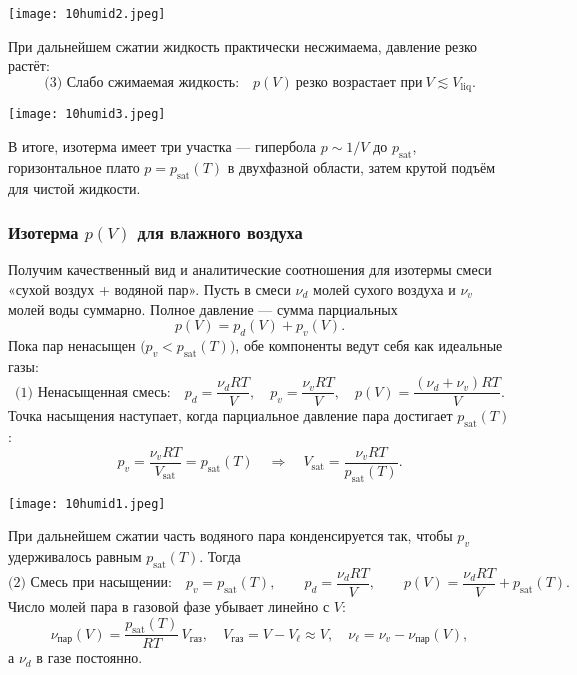 \documentclass[12pt, a4paper]{article}%
\begin{document}
\begin{center}
\texttt{[image: 10humid2.jpeg]}
\label{fig:mpr}
\end{center}

При дальнейшем сжатии жидкость практически несжимаема, давление резко растёт:
\[
\text{(3) Слабо сжимаемая жидкость:}\quad p(V)\ \text{резко возрастает при}\ V\lesssim V_{\text{liq}}.
\]

\begin{center}
\texttt{[image: 10humid3.jpeg]}
\label{fig:mpr}
\end{center}

В итоге, изотерма имеет три участка — гипербола \(p\sim 1/V\) до \(p_{\text{sat}}\), горизонтальное плато \(p=p_{\text{sat}}(T)\) в двухфазной области, затем крутой подъём для чистой жидкости.


\subsubsection*{ Изотерма \(p(V)\) для влажного воздуха}
Получим качественный вид и аналитические соотношения для изотермы смеси «сухой воздух + водяной пар».
Пусть в смеси \(\nu_d\) молей сухого воздуха и \(\nu_v\) молей воды суммарно. Полное давление — сумма парциальных
\[
p(V)=p_d(V)+p_v(V).
\]
Пока пар ненасыщен \(\bigl(p_v < p_{\text{sat}}(T)\bigr)\), обе компоненты ведут себя как идеальные газы:
\[
\text{(1) Ненасыщенная смесь:}\quad
p_d=\frac{\nu_d R T}{V},\quad
p_v=\frac{\nu_v R T}{V},\quad
p(V)=\frac{(\nu_d+\nu_v) R T}{V}.
\]
Точка насыщения наступает, когда парциальное давление пара достигает \(p_{\text{sat}}(T)\):
\[
p_v=\frac{\nu_v R T}{V_\text{sat}}=p_{\text{sat}}(T)\quad\Longrightarrow\quad V_\text{sat}=\frac{\nu_v R T}{p_{\text{sat}}(T)}.
\]

\begin{center}
\texttt{[image: 10humid1.jpeg]}
\label{fig:mpr}
\end{center}

При дальнейшем сжатии часть водяного пара конденсируется так, чтобы \(p_v\) удерживалось равным \(p_{\text{sat}}(T)\). Тогда
\[
\text{(2) Смесь при насыщении:}\quad
p_v=p_{\text{sat}}(T),\qquad
p_d=\frac{\nu_d R T}{V},\qquad
p(V)=\frac{\nu_d R T}{V}+p_{\text{sat}}(T).
\]
Число молей пара в газовой фазе убывает линейно с \(V\):
\[
\nu_{\text{пар}}(V)=\frac{p_{\text{sat}}(T)}{R T}\,V_{\text{газ}},\quad
V_{\text{газ}}=V-V_{\ell}\approx V,\quad
\nu_{\ell}=\nu_v-\nu_{\text{пар}}(V),
\]
а \(\nu_d\) в газе постоянно. 
\end{document}
